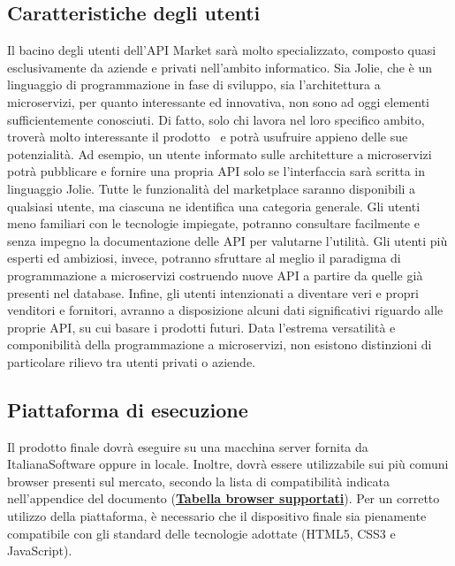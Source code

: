 \subsection{Caratteristiche degli utenti}
Il bacino degli utenti dell'API Market sarà molto specializzato, composto quasi esclusivamente da aziende e privati nell'ambito informatico. Sia Jolie, che è un linguaggio di programmazione in fase di sviluppo, sia l'architettura a microservizi, per quanto interessante ed innovativa, non sono ad oggi elementi sufficientemente conosciuti. Di fatto, solo chi lavora nel loro specifico ambito, troverà molto interessante il prodotto \progetto\ e potrà usufruire appieno delle sue potenzialità. Ad esempio, un utente informato sulle architetture a microservizi potrà pubblicare e fornire una propria API solo se l'interfaccia sarà scritta in linguaggio Jolie. Tutte le funzionalità del marketplace saranno disponibili a qualsiasi utente, ma ciascuna ne identifica una categoria generale. Gli utenti meno familiari con le tecnologie impiegate, potranno consultare facilmente e senza impegno la documentazione delle API per valutarne l'utilità. Gli utenti più esperti ed ambiziosi, invece, potranno sfruttare al meglio il paradigma di programmazione a microservizi costruendo nuove API a partire da quelle già presenti nel database. Infine, gli utenti intenzionati a diventare veri e propri venditori e fornitori, avranno a disposizione alcuni dati significativi riguardo alle proprie API, su cui basare i prodotti futuri. Data l'estrema versatilità e componibilità della programmazione a microservizi, non esistono distinzioni di particolare rilievo tra utenti privati o aziende.

\subsection{Piattaforma di esecuzione}
Il prodotto finale dovrà eseguire su una macchina server fornita da ItalianaSoftware oppure in locale. Inoltre, dovrà essere utilizzabile sui più comuni browser presenti sul mercato, secondo la lista di compatibilità indicata nell'appendice del documento (\textbf{\hyperref[Tabella-browser-supportati]{Tabella browser supportati}}). Per un corretto utilizzo della piattaforma, è necessario che il dispositivo finale sia pienamente compatibile con gli standard delle tecnologie adottate (HTML5, CSS3 e JavaScript).

